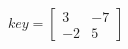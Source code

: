 \documentclass[10pt]{article}
\begin{document}
\begin{align*}key = \left[ \begin{array}{ccc}
3 & -7\\
-2 & 5\end{array} \right]
\end{align*}
\end{document}
